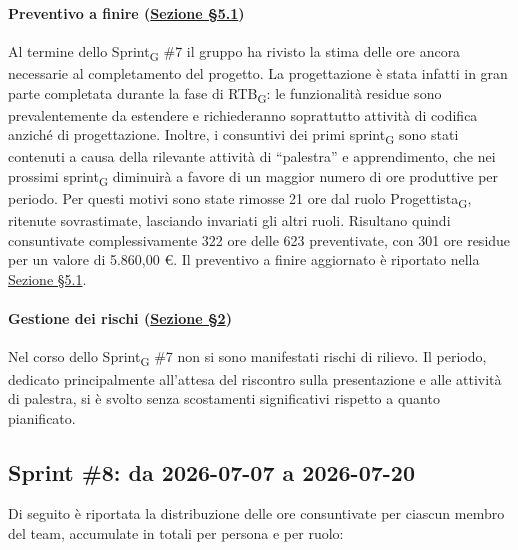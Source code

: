 ﻿\documentclass[a4paper, 10pt, colorlinks=true, linkcolor=black, urlcolor=blue, citecolor=blue, hidelinks]{article}
\begin{document}
\paragraph{Preventivo a finire (\hyperref[tab:preventivo-finire]{Sezione \S5.1})}
Al termine dello Sprint\textsubscript{G} \#7 il gruppo ha rivisto la stima delle ore ancora necessarie al completamento del progetto. La progettazione è stata infatti in gran parte completata durante la fase di RTB\textsubscript{G}: le funzionalità residue sono prevalentemente da estendere e richiederanno soprattutto attività di codifica anziché di progettazione. Inoltre, i consuntivi dei primi sprint\textsubscript{G} sono stati contenuti a causa della rilevante attività di ``palestra'' e apprendimento, che nei prossimi sprint\textsubscript{G} diminuirà a favore di un maggior numero di ore produttive per periodo. Per questi motivi sono state rimosse 21 ore dal ruolo Progettista\textsubscript{G}, ritenute sovrastimate, lasciando invariati gli altri ruoli. Risultano quindi consuntivate complessivamente 322 ore delle 623 preventivate, con 301 ore residue per un valore di 5.860,00 €. Il preventivo a finire aggiornato è riportato nella \hyperref[tab:preventivo-finire]{Sezione \S5.1}.

\paragraph{Gestione dei rischi (\hyperref[tab:gestione-rischi]{Sezione \S2})}
Nel corso dello Sprint\textsubscript{G} \#7 non si sono manifestati rischi di rilievo. Il periodo, dedicato principalmente all'attesa del riscontro sulla presentazione e alle attività di palestra, si è svolto senza scostamenti significativi rispetto a quanto pianificato.

\subsection{Sprint \#8: da 2026-07-07 a 2026-07-20}
Di seguito è riportata la distribuzione delle ore consuntivate per ciascun membro del team, accumulate in totali per persona e per ruolo:
\end{document}
